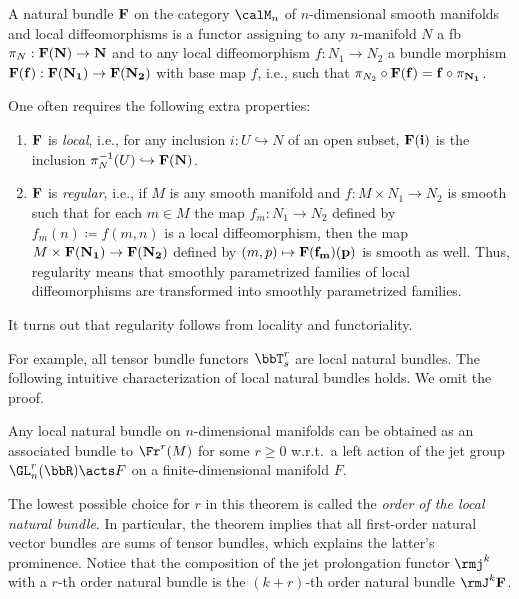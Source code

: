 \begin{defn}\label{def natural bundle}
    A natural bundle $\bf{F}$ on the category $\calM_n$ of $n$-dimensional smooth manifolds and local diffeomorphisms is a functor assigning to any $n$-manifold $N$ a \gls{fb} $\pi_N:\bf{F}(N)\to N$ and to any local diffeomorphism $f:N_1\to N_2$ a bundle morphism $\bf{F}(f):\bf{F}(N_1)\to \bf{F}(N_2)$ with base map $f$, i.e., such that $\pi_{N_2}\circ \bf{F}(f)=f\circ \pi_{N_1}$. 

    One often requires the following extra properties:
    \begin{enumerate}[label=(\alph*)]
        \item $\bf{F}$ is \emph{local}, i.e., for any inclusion $i:U\hookrightarrow N$ of an open subset, $\bf{F}(i)$ is the inclusion $\pi^{-1}_N(U)\hookrightarrow \bf{F}(N)$.
    
        \item $\bf{F}$ is \emph{regular}, i.e., if $M$ is any smooth manifold and $f:M\times N_1\to N_2$ is smooth such that for each $m\in M$ the map $f_m:N_1\to N_2$ defined by $f_m(n)\coloneqq f(m,n)$ is a local diffeomorphism, then the map $M\times \bf{F}(N_1)\to \bf{F}(N_2)$ defined by $(m,p)\mapsto \bf{F}(f_m)(p)$ is smooth as well. Thus, regularity means that smoothly parametrized families of local diffeomorphisms are transformed into smoothly parametrized families.
    \end{enumerate}
    It turns out that regularity follows from locality and functoriality.
\end{defn}

For example, all tensor bundle functors $\bbT^r_s$ are local natural bundles. The following intuitive characterization of local natural bundles holds. We omit the proof.

\begin{thm}\label{thm 1.2.8 Cap}
    Any local natural bundle on $n$-dimensional manifolds can be obtained as an associated bundle to $\Fr^r (M)$ for some $r\geq 0$ w.r.t.\ a left action of the jet group $\GL^r_n(\bbR)\acts F$ on a finite-dimensional manifold $F$.
\end{thm}

The lowest possible choice for $r$ in this theorem is called the \emph{order of the local natural bundle}. In particular, the theorem implies that all first-order natural vector bundles are sums of tensor bundles, which explains the latter's prominence. Notice that the composition of the jet prolongation functor $\rmj^k$ with a $r$-th order natural bundle is the $(k+r)$-th order natural bundle $\rmJ^k \bf{F}$.

